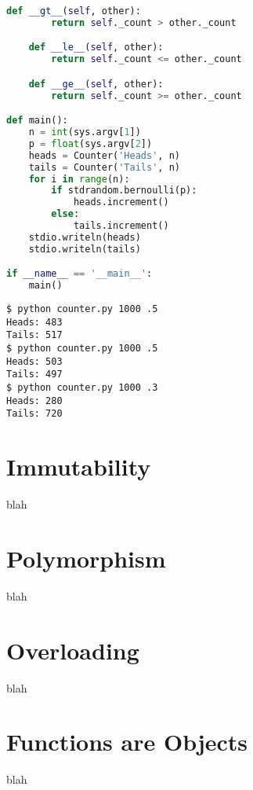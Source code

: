 \documentclass[8pt,a4paper,compress,handout]{beamer}
\begin{document}
\begin{frame}[fragile]
\begin{lstlisting}[language=Python]
    def __gt__(self, other):
        return self._count > other._count

    def __le__(self, other):
        return self._count <= other._count

    def __ge__(self, other):
        return self._count >= other._count

def main():
    n = int(sys.argv[1])
    p = float(sys.argv[2])
    heads = Counter('Heads', n)
    tails = Counter('Tails', n)
    for i in range(n):
        if stdrandom.bernoulli(p):
            heads.increment()
        else:
            tails.increment()
    stdio.writeln(heads)
    stdio.writeln(tails)

if __name__ == '__main__':
    main()
\end{lstlisting}

\begin{lstlisting}[language={}]
$ python counter.py 1000 .5
Heads: 483
Tails: 517
$ python counter.py 1000 .5
Heads: 503
Tails: 497
$ python counter.py 1000 .3
Heads: 280
Tails: 720
\end{lstlisting}
\end{frame}

\section{Immutability}
\begin{frame}[fragile]
blah
\end{frame}

\section{Polymorphism}
\begin{frame}[fragile]
blah
\end{frame}

\section{Overloading}
\begin{frame}[fragile]
blah
\end{frame}

\section{Functions are Objects}
\begin{frame}[fragile]
blah
\end{frame}
\end{document}
